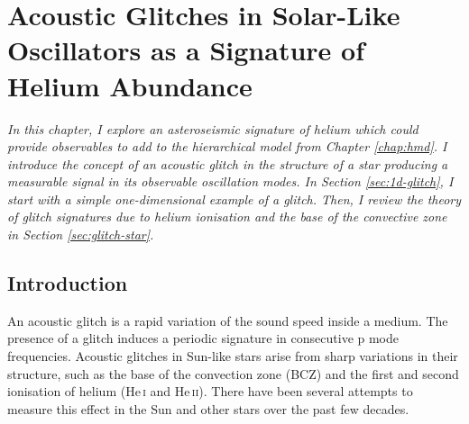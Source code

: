 %
%
%
%
%
\chapter[Acoustic Glitches in Solar-Like Oscillators]{Acoustic Glitches in Solar-Like Oscillators as a Signature of Helium Abundance}\label{chap:glitch}

\textit{In this chapter, I explore an asteroseismic signature of helium which could provide observables to add to the hierarchical model from Chapter \ref{chap:hmd}. I introduce the concept of an acoustic glitch in the structure of a star producing a measurable signal in its observable oscillation modes. In Section \ref{sec:1d-glitch}, I start with a simple one-dimensional example of a glitch. Then, I review the theory of glitch signatures due to helium ionisation and the base of the convective zone in Section \ref{sec:glitch-star}.}

\section{Introduction}


An acoustic glitch is a rapid variation of the sound speed inside a medium. The presence of a glitch induces a periodic signature in consecutive p mode frequencies. Acoustic glitches in Sun-like stars arise from sharp variations in their structure, such as the base of the convection zone (BCZ) and the first and second ionisation of helium (He\,\textsc{i} and He\,\textsc{ii}). There have been several attempts to measure this effect in the Sun and other stars over the past few decades.


